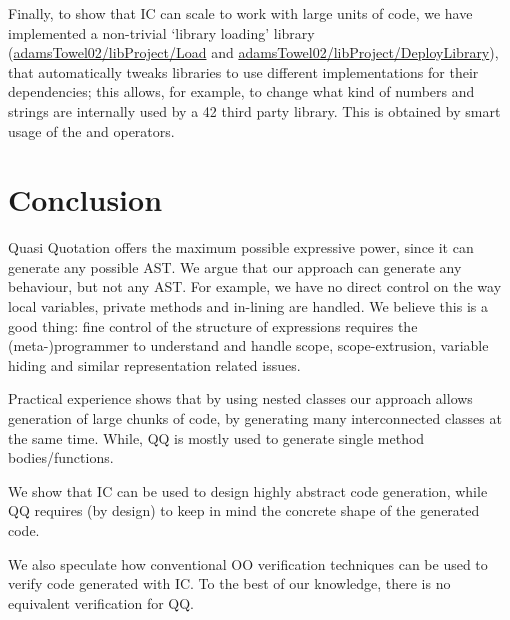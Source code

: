 Finally, to show that IC can scale to work with large units of code,
we have implemented a non-trivial `library loading' library
(\url{adamsTowel02/libProject/Load} and
\url{adamsTowel02/libProject/DeployLibrary}), that 
automatically tweaks libraries to use different implementations for their dependencies;
this allows, for example, to change what kind of numbers and 
strings are internally used by a 42 third party library.
This is obtained by smart usage of the \Q@Redirect@ and \Q@Rename@ operators.



\section{Conclusion}
Quasi Quotation offers the maximum possible expressive power, since it can generate any possible AST.
We argue that our approach can generate any behaviour, but not any AST.
For example, we have no direct control on the way local variables, private methods 
and in-lining are handled.
We believe this is a good thing: fine control of the structure of expressions requires
the (meta-)programmer to understand and handle scope, scope-extrusion, variable hiding and similar
representation related issues.


Practical experience shows that by using nested classes our approach allows generation of large chunks of code,
by generating many interconnected classes at the same time. While, QQ is mostly used to generate single method bodies/functions.

We show that IC can be used to design highly abstract code generation, 
while QQ requires (by design) to keep in mind the concrete shape of the generated code.


We also speculate how conventional OO verification techniques can be
used to verify code generated with IC. To the best of our knowledge, there is no
equivalent verification for QQ.

